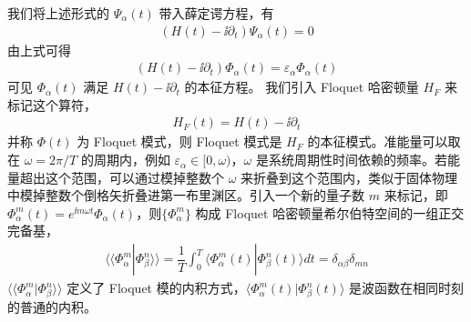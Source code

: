 我们将上述形式的 $\Psi_{\alpha}(t)$ 带入薛定谔方程，有
\begin{align}
(H(t) - \ii\partial_t) \Psi_{\alpha}(t) = 0
\end{align}
由上式可得
\begin{align}
(H(t) - \ii\partial_t) \Phi_{\alpha}(t) = \varepsilon_{\alpha} \Phi_{\alpha}(t)
\end{align}
可见 $\Phi_{\alpha}(t)$ 满足 $H(t) - \ii\partial_t$ 的本征方程。
我们引入 Floquet 哈密顿量 $H_F$ 来标记这个算符， 
\begin{align}
H_F(t) = H(t) - \ii\partial_t
\end{align}
并称 $\Phi(t)$ 为 Floquet 模式，则 Floquet 模式是 $H_F$ 的本征模式。准能量可以取在 $\omega = 2\pi/T$ 的周期内，例如 $\varepsilon_{\alpha}\in[0,\omega)$，$\omega$ 是系统周期性时间依赖的频率。若能量超出这个范围，可以通过模掉整数个 $\omega$ 来折叠到这个范围内，类似于固体物理中模掉整数个倒格矢折叠进第一布里渊区。引入一个新的量子数 $m$ 来标记，即 $\Phi_{\alpha}^{m}(t)=e^{\ii m\omega t}\Phi_{\alpha}(t)$，则$\{\Phi_{\alpha}^{m}\}$ 构成 Floquet 哈密顿量希尔伯特空间的一组正交完备基，
\begin{align}
\langle\langle \Phi_{\alpha}^{m}|\Phi_{\beta}^{n}\rangle\rangle
= \dfrac{1}{T}\int_0^T \langle\Phi_{\alpha}^{m}(t)|\Phi_{\beta}^{n}(t)\rangle dt = \delta_{\alpha\beta}\delta_{mn}
\end{align}
$\langle\langle \Phi_{\alpha}^{m}|\Phi_{\beta}^{n}\rangle\rangle$ 定义了 Floquet 模的内积方式，$\langle\Phi_{\alpha}^{m}(t)|\Phi_{\beta}^{n}(t)\rangle$ 是波函数在相同时刻的普通的内积。

